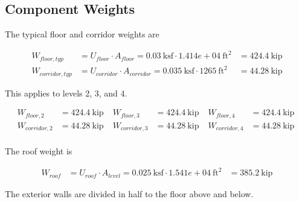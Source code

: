 \documentclass[11pt]{article}
\begin{document}
    
    \subsection{Component Weights}\label{component-weights}

    The typical floor and corridor weights are

    \begin{equation*}
\begin{aligned}
W_{floor,typ} &= U_{floor} \cdot A_{floor}  = 0.03\ \mathrm{ksf} \cdot 1.414e+04\ \mathrm{ft}^{2} &= 424.4\ \mathrm{kip}  
\\
W_{corridor,typ} &= U_{corridor} \cdot A_{corridor}  = 0.035\ \mathrm{ksf} \cdot 1265\ \mathrm{ft}^{2} &= 44.28\ \mathrm{kip}  
\end{aligned}
\end{equation*}

    
    This applies to levels 2, 3, and 4.

    \begin{equation*}
\begin{aligned}
W_{floor,2} &= 424.4\ \mathrm{kip} \; 
 &W_{floor,3} &= 424.4\ \mathrm{kip} \; 
 &W_{floor,4} &= 424.4\ \mathrm{kip} \; 
\\
 W_{corridor,2} &= 44.28\ \mathrm{kip} \; 
 &W_{corridor,3} &= 44.28\ \mathrm{kip} \; 
 &W_{corridor,4} &= 44.28\ \mathrm{kip} \; 
\\
\end{aligned}
\end{equation*}

    
    The roof weight is

    \begin{equation*}
\begin{aligned}
W_{roof} &= U_{roof} \cdot A_{level}  = 0.025\ \mathrm{ksf} \cdot 1.541e+04\ \mathrm{ft}^{2} &= 385.2\ \mathrm{kip}  
\end{aligned}
\end{equation*}

    
    The exterior walls are divided in half to the floor above and below.
\end{document}

